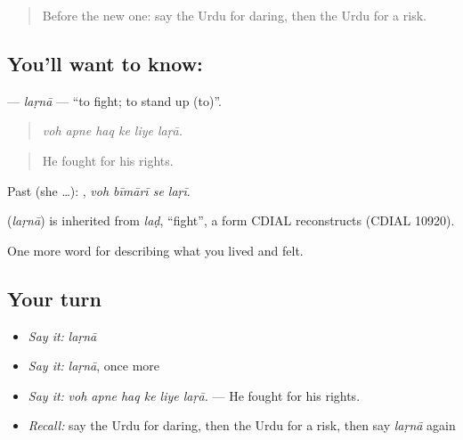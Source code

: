 \label{lesson:UR-C460-larna}



\begin{quote}
Before the new one: say the Urdu for daring, then the Urdu for a risk.
\end{quote}

\subsection*{You'll want to know: }
\textbf{} — \emph{laṛnā} — \textquotedblleft{}to fight; to stand up (to)\textquotedblright{}.

\begin{quote}
     
\end{quote}

\begin{quote}
\emph{voh apne haq ke liye laṛā.}
\end{quote}

\begin{quote}
He fought for his rights.
\end{quote}

Past (she …):    , \emph{voh bīmārī se laṛī}.

\begin{cousinweb}
\textbf{} (\emph{laṛnā}) is inherited from \emph{laḍ}, \textquotedblleft{}fight\textquotedblright{}, a form CDIAL reconstructs (CDIAL 10920).
\end{cousinweb}

\begin{grammarlens}[title={What you've built}]
One more word for describing what you lived and felt.
\end{grammarlens}

\subsection*{Your turn}
\begin{itemize}
\raggedright
  \item \emph{Say it:} \emph{laṛnā}
  \item \emph{Say it:} \emph{laṛnā}, once more
  \item \emph{Say it:} \emph{voh apne haq ke liye laṛā.} — He fought for his rights.
  \item \emph{Recall:} say the Urdu for daring, then the Urdu for a risk, then say \emph{laṛnā} again
\end{itemize}

